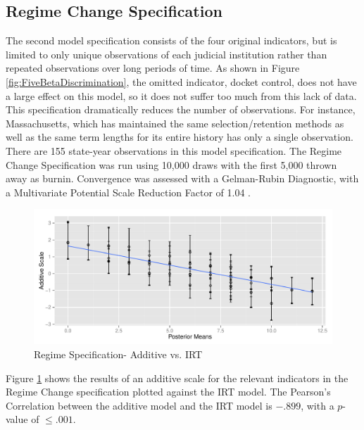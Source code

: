 \documentclass[12pt]{article}
\begin{document}
\subsection{Regime Change Specification}
The second model specification consists of the four original indicators, but is limited to only unique observations of each judicial institution rather than repeated observations over long periods of time.  As shown in Figure \ref{fig:FiveBetaDiscrimination}, the omitted indicator, docket control, does not have a large effect on this model, so it does not suffer too much from this lack of data.  This specification dramatically reduces the number of observations.  For instance, Massachusetts, which has maintained the same selection/retention methods as well as the same term lengths for its entire history has only a single observation.  There are 155 state-year observations in this model specification.  The Regime Change Specification was run using 10,000 draws with the first 5,000 thrown away as burnin.  Convergence was assessed with a Gelman-Rubin Diagnostic, with a Multivariate Potential Scale Reduction Factor of 1.04 \citep{Gelman1992}.  

\begin{figure}
	\centering
	\caption{Regime Specification- Additive vs. IRT}
	\label{fig:regime_additive_ggplot.pdf}
	\includegraphics[width=0.7\linewidth]{graphics/regime/regime_additive_ggplot}
\end{figure}

Figure \ref{fig:regime_additive_ggplot.pdf} shows the results of an additive scale for the relevant indicators in the Regime Change specification plotted against the IRT model.  The Pearson's Correlation between the additive model and the IRT model is $-.899$, with a $p$-value of $\leq.001$.
\end{document}
